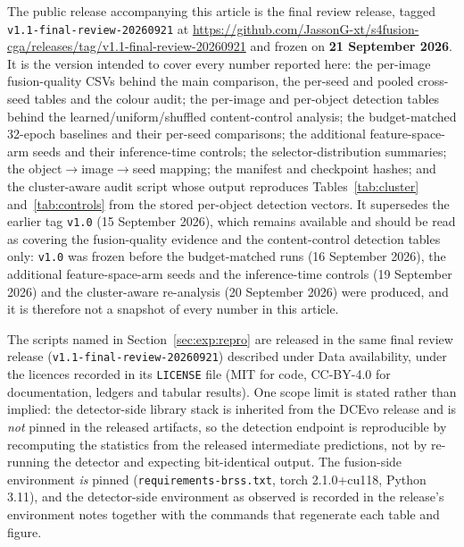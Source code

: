 \documentclass[pdflatex,sn-mathphys-num]{sn-jnl}
\theoremstyle{thmstyleone}%
\theoremstyle{thmstyletwo}%
\theoremstyle{thmstylethree}%
\begin{document}
The public release accompanying this article is the final review release, tagged \texttt{v1.1-final-review-20260921} at \url{https://github.com/JassonG-xt/s4fusion-cga/releases/tag/v1.1-final-review-20260921} and frozen on \textbf{21 September 2026}. It is the version intended to cover every number reported here: the per-image fusion-quality CSVs behind the main comparison, the per-seed and pooled cross-seed tables and the colour audit; the per-image and per-object detection tables behind the learned/uniform/shuffled content-control analysis; the budget-matched 32-epoch baselines and their per-seed comparisons; the additional feature-space-arm seeds and their inference-time controls; the selector-distribution summaries; the object$\to$image$\to$seed mapping; the manifest and checkpoint hashes; and the cluster-aware audit script whose output reproduces Tables~\ref{tab:cluster} and~\ref{tab:controls} from the stored per-object detection vectors. It supersedes the earlier tag \texttt{v1.0} (15 September 2026), which remains available and should be read as covering the fusion-quality evidence and the content-control detection tables only: \texttt{v1.0} was frozen before the budget-matched runs (16 September 2026), the additional feature-space-arm seeds and the inference-time controls (19 September 2026) and the cluster-aware re-analysis (20 September 2026) were produced, and it is therefore not a snapshot of every number in this article.

The scripts named in Section~\ref{sec:exp:repro} are released in the same final review release (\texttt{v1.1-final-review-20260921}) described under Data availability, under the licences recorded in its \texttt{LICENSE} file (MIT for code, CC-BY-4.0 for documentation, ledgers and tabular results). One scope limit is stated rather than implied: the detector-side library stack is inherited from the DCEvo release and is \emph{not} pinned in the released artifacts, so the detection endpoint is reproducible by recomputing the statistics from the released intermediate predictions, not by re-running the detector and expecting bit-identical output. The fusion-side environment \emph{is} pinned (\texttt{requirements-brss.txt}, torch 2.1.0+cu118, Python 3.11), and the detector-side environment as observed is recorded in the release's environment notes together with the commands that regenerate each table and figure.
\end{document}
